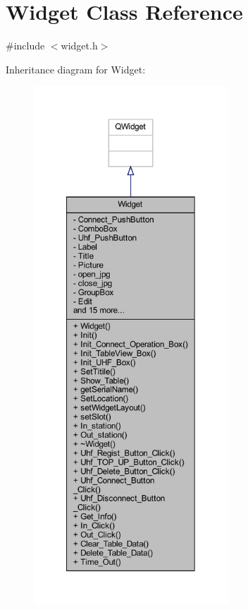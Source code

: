 \hypertarget{class_widget}{}\section{Widget Class Reference}
\label{class_widget}


{\ttfamily \#include $<$widget.\+h$>$}



Inheritance diagram for Widget\+:
\nopagebreak
\begin{figure}[H]
\begin{center}
\leavevmode
\includegraphics[height=550pt]{class_widget__inherit__graph}
\end{center}
\end{figure}


